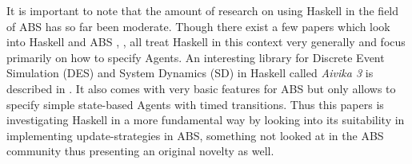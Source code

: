 It is important to note that the amount of research on using Haskell in the field of ABS has so far been moderate. Though there exist a few papers which look into Haskell and ABS \cite{de_jong_suitability_2014}, \cite{sulzmann_specifying_2007}, \cite{jankovic_functional_2007} all treat Haskell in this context very generally and focus primarily on how to specify Agents. An interesting library for Discrete Event Simulation (DES) and System Dynamics (SD) in Haskell called \textit{Aivika 3} is described in \cite{sorokin_aivika_2015}. It also comes with very basic features for ABS but only allows to specify simple state-based Agents with timed transitions. Thus this papers is investigating Haskell in a more fundamental way by looking into its suitability in implementing update-strategies in ABS, something not looked at in the ABS community thus presenting an original novelty as well.